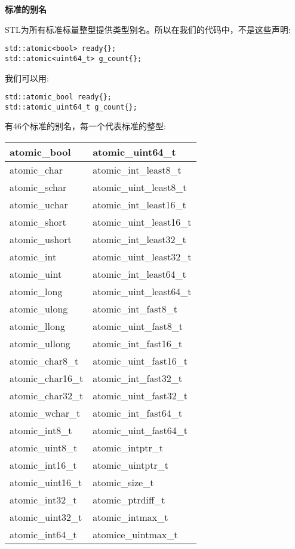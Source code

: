 \noindent
\textbf{标准的别名}

STL为所有标准标量整型提供类型别名。所以在我们的代码中，不是这些声明:

\begin{lstlisting}[style=styleCXX]
std::atomic<bool> ready{};
std::atomic<uint64_t> g_count{};
\end{lstlisting}

我们可以用:

\begin{lstlisting}[style=styleCXX]
std::atomic_bool ready{};
std::atomic_uint64_t g_count{};
\end{lstlisting}

有46个标准的别名，每一个代表标准的整型:

\begin{table}[H]
\centering
\begin{tabular}{|l|l|}
\hline
atomic\_bool      & atomic\_uint64\_t        \\ \hline
atomic\_char      & atomic\_int\_least8\_t   \\ \hline
atomic\_schar     & atomic\_uint\_least8\_t  \\ \hline
atomic\_uchar     & atomic\_int\_least16\_t  \\ \hline
atomic\_short     & atomic\_uint\_least16\_t \\ \hline
atomic\_ushort    & atomic\_int\_least32\_t  \\ \hline
atomic\_int       & atomic\_uint\_least32\_t \\ \hline
atomic\_uint      & atomic\_int\_least64\_t  \\ \hline
atomic\_long      & atomic\_uint\_least64\_t \\ \hline
atomic\_ulong     & atomic\_int\_fast8\_t    \\ \hline
atomic\_llong     & atomic\_uint\_fast8\_t   \\ \hline
atomic\_ullong    & atomic\_int\_fast16\_t   \\ \hline
atomic\_char8\_t  & atomic\_uint\_fast16\_t  \\ \hline
atomic\_char16\_t & atomic\_int\_fast32\_t   \\ \hline
atomic\_char32\_t & atomic\_uint\_fast32\_t  \\ \hline
atomic\_wchar\_t  & atomic\_int\_fast64\_t   \\ \hline
atomic\_int8\_t   & atomic\_uint\_fast64\_t  \\ \hline
atomic\_uint8\_t  & atomic\_intptr\_t        \\ \hline
atomic\_int16\_t  & atomic\_uintptr\_t       \\ \hline
atomic\_uint16\_t & atomic\_size\_t          \\ \hline
atomic\_int32\_t  & atomic\_ptrdiff\_t       \\ \hline
atomic\_uint32\_t & atomic\_intmax\_t        \\ \hline
atomic\_int64\_t  & atomice\_uintmax\_t      \\ \hline
\end{tabular}
\end{table}

